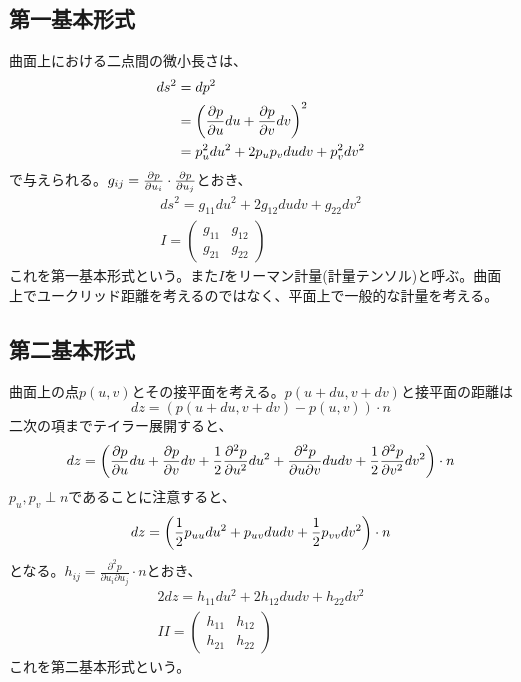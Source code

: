         \subsection{第一基本形式}
            曲面上における二点間の微小長さは、
            \begin{align*}
                ds^2 &= dp^2\\
                &= \lr{\pd[p]{u}du+\pd[p]{v}dv}^2\\
                &= p_u^2du^2+2p_up_vdudv+p_v^2dv^2
            \end{align*}
            で与えられる。$g_{ij}=\pd[p]{u_i}\cdot \pd[p]{u_j}$とおき、
            \begin{gather*}
                ds^2 = g_{11}du^2+2g_{12}dudv+g_{22}dv^2 \\
                I = \begin{pmatrix}
                    g_{11} & g_{12}\\
                    g_{21} & g_{22}
                   \end{pmatrix}
            \end{gather*}
            これを第一基本形式という。また$I$をリーマン計量(計量テンソル)と呼ぶ。曲面上でユークリッド距離を考えるのではなく、平面上で一般的な計量を考える。

        \subsection{第二基本形式}
            曲面上の点$p(u,v)$とその接平面を考える。$p(u+du,v+dv)$と接平面の距離は
                \[dz = (p(u+du,v+dv)-p(u,v))\cdot n\]
            二次の項までテイラー展開すると、
                \[
                    dz = \lr{\pd[p]{u}du+\pd[p]{v}dv
                    + \rec{2}\pd[^2p]{u^2}du^2
                    + \frac{\partial^2 p}{\partial u\partial v}dudv
                    + \rec{2}\pd[^2p]{v^2}dv^2}\cdot n
                \]
            $p_u,p_v\perp n$であることに注意すると、
                \[dz = \lr{\rec{2}p_{uu}du^2 + p_{uv}dudv + \rec{2}p_{vv}dv^2} \cdot n\]
            となる。$h_{ij}=\frac{\partial^2p}{\partial u_i\partial u_j}\cdot n$とおき、
            \begin{gather*}
                2dz = h_{11}du^2+2h_{12}dudv+h_{22}dv^2 \\
                II = \begin{pmatrix}
                    h_{11} & h_{12}\\
                    h_{21} & h_{22}
                   \end{pmatrix}
            \end{gather*}
            これを第二基本形式という。

